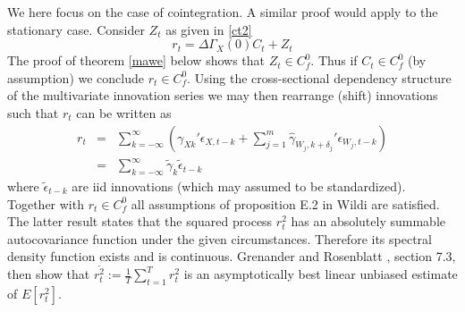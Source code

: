 \documentclass[11pt]{article}
\begin{document}
\begin{appendix}
We here focus on the case of cointegration. A similar proof would
apply to the stationary case. Consider $Z_t$ as given in \ref{ct2}
\[r_t=\Delta\Gamma_X(0)C_t+Z_t\]
The proof of theorem \ref{mawe} below shows that $Z_t\in C_f^0$.
Thus if $C_t\in C_f^0$ (by assumption) we conclude $r_t\in C_f^0$.
Using the cross-sectional dependency structure of the multivariate
innovation series we may then rearrange (shift) innovations such
that $r_t$ can be written as
\begin{eqnarray*}
r_t&=&\sum_{k=-\infty}^\infty\left(
\gamma_{Xk}'\epsilon_{X,t-k}+\sum_{j=1}^m
\hat{\gamma}_{W_j,k+\delta_j}'\epsilon_{W_j,t-k}\right)\\
&=&\sum_{k=-\infty}^\infty \tilde{\gamma}_{k}\tilde{\epsilon}_{t-k}
\end{eqnarray*}
where $\tilde{\epsilon}_{t-k}$ are iid innovations (which may
assumed to be standardized). Together with $r_t\in C_f^0$ all
assumptions of proposition E.2 in Wildi \cite{wildi2004} are
satisfied. The latter result states that the squared process $r_t^2$
has an absolutely summable autocovariance function under the given
circumstances. Therefore its spectral density function exists and is
continuous. Grenander and Rosenblatt \cite{grenanderrosenblatt57},
section 7.3, then show that \(\overline{r_t^2}:=\frac{1}{T}
\sum_{t=1}^{T} r_t^2\) is an asymptotically {best linear unbiased
estimate} of \(E[r_t^2]\). \\



\end{appendix}
\end{document}
